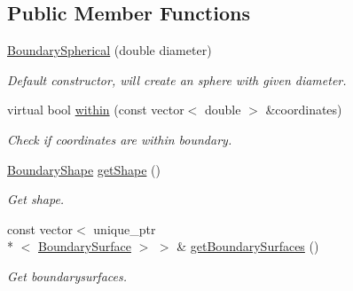 \subsection*{Public Member Functions}
\begin{DoxyCompactItemize}
\item 
\hyperlink{classBoundarySpherical_ae94c30c1bbb81df2cb57aef65eecfa10}{Boundary\+Spherical} (double diameter)
\begin{DoxyCompactList}\small\item\em Default constructor, will create an sphere with given diameter. \end{DoxyCompactList}\item 
virtual bool \hyperlink{classBoundarySpherical_a653f35719ff4baec5848053093978ee9}{within} (const vector$<$ double $>$ \&coordinates)
\begin{DoxyCompactList}\small\item\em Check if coordinates are within boundary. \end{DoxyCompactList}\item 
\hyperlink{Boundary_8h_a0099b369f2bc119c1b54728734b41132}{Boundary\+Shape} \hyperlink{classBoundary_a20d2121527b207eed35f6719393e3499}{get\+Shape} ()
\begin{DoxyCompactList}\small\item\em Get shape. \end{DoxyCompactList}\item 
const vector$<$ unique\+\_\+ptr\\*
$<$ \hyperlink{classBoundarySurface}{Boundary\+Surface} $>$ $>$ \& \hyperlink{classBoundary_acfa6640f65c432e339108887913539eb}{get\+Boundary\+Surfaces} ()
\begin{DoxyCompactList}\small\item\em Get boundarysurfaces. \end{DoxyCompactList}\end{DoxyCompactItemize}
